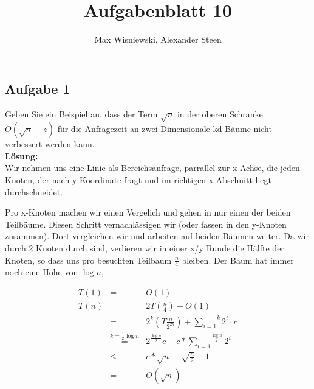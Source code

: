 \documentclass[11pt,a4paper,ngerman]{article}
\date{}
\title{Aufgabenblatt 10}
\author{Max Wisniewski, Alexander Steen}
\begin{document}

\renewcommand{\figurename}{Figur}

\maketitle
\thispagestyle{fancy}

\subsection*{Aufgabe 1}

Geben Sie ein Beispiel an, dass der Term $\sqrt{n}$ in der oberen Schranke $O( \sqrt{n} + z)$ für die Anfragezeit
an zwei Dimensionale kd-Bäume nicht verbessert werden kann.\\

\textbf{Lösung:}\\

Wir nehmen uns eine Linie als Bereichsanfrage, parrallel zur x-Achse, die jeden Knoten, der nach y-Koordinate
fragt und im richtigen x-Abschnitt liegt durchschneidet.

\vspace{5cm}

Pro x-Knoten machen wir einen Vergelich und gehen in nur einen der beiden Teilbäume. Diesen Schritt vernachlässigen wir
(oder fassen in den y-Knoten zusammen). Dort vergleichen wir und arbeiten auf beiden Bäumen weiter.
Da wir durch 2 Knoten durch sind, verlieren wir in einer x/y Runde die Hälfte der Knoten, so dass uns 
pro besuchten Teilbaum $\frac{n}{4}$ bleiben. Der Baum hat immer noch eine Höhe von $\log n$,

\begin{equation*}\begin{array}{rcl}
    T(1) &=& O(1)\\
    T(n) &=& 2 T(\frac{n}{4}) + O(1)\\
        &=& 2^k (T\frac{n}{2^{2k}}) + \overset{k}{\underset{i=1}{\sum}} 2^i \cdot c\\
        &\stackrel{k=\frac{1}{2}\log n}{=}& 2^{\frac{\log n}{2}} c + c * \overset{\frac{\log n}{2}}{\underset{i=1}{\sum}} 2^i\\
        &\leq& c * \sqrt{n} + \sqrt{\frac{n}{2}} - 1\\
        &=& O(\sqrt{n})
\end{array}\end{equation*}
\end{document}
